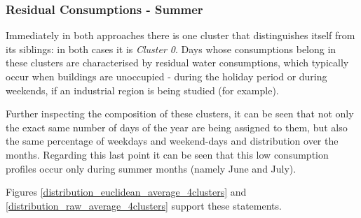\documentclass[9pt,journal,compsoc]{IEEEtran}
\begin{document}
\subsubsection{Residual Consumptions - Summer}
\label{residual_consumptions}

Immediately in both approaches there is one cluster that distinguishes itself from its siblings: in both cases it is \emph{Cluster 0}. Days whose consumptions belong in these clusters are characterised by residual water consumptions, which typically occur when buildings are unoccupied - during the holiday period or during weekends, if an industrial region is being studied (for example).

Further inspecting the composition of these clusters, it can be seen that not only the exact same number of days of the year are being assigned to them, but also the same percentage of weekdays and weekend-days and distribution over the months. Regarding this last point it can be seen that this low consumption profiles occur only during summer months (namely June and July).

Figures \ref{distribution_euclidean_average_4clusters} and \ref{distribution_raw_average_4clusters} support these statements.
\end{document}
